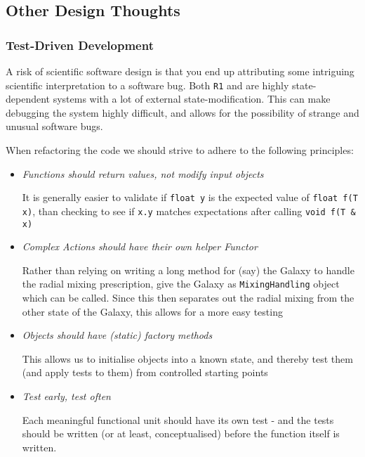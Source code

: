 \documentclass[a4paper,10pt]{article}
\begin{document}
			\subsection{Other Design Thoughts}

				\subsubsection{Test-Driven Development}

					A risk of scientific software design is that you end up attributing some intriguing scientific interpretation to a software bug. Both \texttt{R1} and \RTwo{} are highly state-dependent systems with a lot of external state-modification. This can make debugging the system highly difficult, and allows for the possibility of strange and unusual software bugs. 
					
					When refactoring the code we should strive to adhere to the following principles:
					\begin{itemize}
						\item \textit{Functions should return values, not modify input objects}
						
						It is generally easier to validate if \texttt{float y} is the expected value of \texttt{float f(T x)}, than checking to see if \texttt{x.y} matches expectations after calling \texttt{void f(T \& x)}

						\item \textit{Complex Actions should have their own helper Functor}
						
						Rather than relying on writing a long method for (say) the Galaxy to handle the radial mixing prescription, give the Galaxy as \texttt{MixingHandling} object which can be called. Since this then separates out the radial mixing from the other state of the Galaxy, this allows for a more easy testing 

						\item \textit{Objects should have (static) factory methods}
						
						This allows us to initialise objects into a known state, and thereby test them (and apply tests to them) from controlled starting points

						\item \textit{Test early, test often}
						
						Each meaningful functional unit should have its own test - and the tests should be written (or at least, conceptualised) before the function itself is written. 
					\end{itemize}
\end{document}

